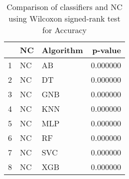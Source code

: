 \begin{table}
\footnotesize
\caption{Comparison of classifiers and NC using Wilcoxon signed-rank test for Accuracy}
\label{tab:NC wilcoxon Accuracy comparison}
\begin{tabular}{lllr}
\hline
 & NC & Algorithm & p-value \\
\hline
1 & NC & AB & 0.000000 \\
2 & NC & DT & 0.000000 \\
3 & NC & GNB & 0.000000 \\
4 & NC & KNN & 0.000000 \\
5 & NC & MLP & 0.000000 \\
6 & NC & RF & 0.000000 \\
7 & NC & SVC & 0.000000 \\
8 & NC & XGB & 0.000000 \\
\hline
\end{tabular}
\end{table}
